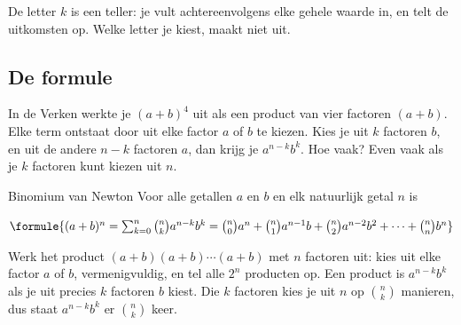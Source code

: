 
De letter $k$ is een teller: je vult achtereenvolgens elke gehele waarde in, en telt de uitkomsten op. Welke letter je kiest, maakt niet uit.

\begin{oefeningen}
\end{oefeningen}

\subsection{De formule}

In de Verken werkte je $(a + b)^4$ uit als een product van vier factoren $(a + b)$. Elke term ontstaat door uit elke factor $a$ of $b$ te kiezen. Kies je uit $k$ factoren $b$, en uit de andere $n - k$ factoren $a$, dan krijg je $a^{n - k}b^k$. Hoe vaak? Even vaak als je $k$ factoren kunt kiezen uit $n$.

\begin{theorie}
\begin{stelling}{Binomium van Newton}
Voor alle getallen $a$ en $b$ en elk natuurlijk getal $n$ is

\vspace{1mm}
\qquad $\formule{(a + b)^n = \sum_{k=0}^{n} \binom{n}{k} a^{n - k} b^k = \binom{n}{0}a^n + \binom{n}{1}a^{n - 1}b + \binom{n}{2}a^{n - 2}b^2 + \cdots + \binom{n}{n}b^n}$
\end{stelling}

\begin{bewijs}
Werk het product $(a + b)(a + b) \cdots (a + b)$ met $n$ factoren uit: kies uit elke factor $a$ of $b$, vermenigvuldig, en tel alle $2^n$ producten op. Een product is $a^{n - k}b^k$ als je uit precies $k$ factoren $b$ kiest. Die $k$ factoren kies je uit $n$ op $\binom{n}{k}$ manieren, dus staat $a^{n - k}b^k$ er $\binom{n}{k}$ keer.
\end{bewijs}
\end{theorie}


